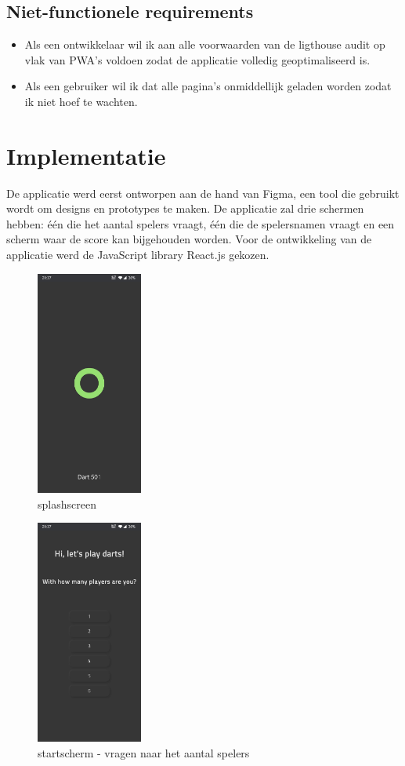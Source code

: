 	\subsection{Niet-functionele requirements}
		\begin{itemize}
			 \item Als een ontwikkelaar wil ik aan alle voorwaarden van de ligthouse audit op vlak van PWA's voldoen zodat de applicatie volledig geoptimaliseerd is.
			 \item Als een gebruiker wil ik dat alle pagina's onmiddellijk geladen worden zodat ik niet hoef te wachten.
		\end{itemize}	


\section{Implementatie}

	De applicatie werd eerst ontworpen aan de hand van Figma, een tool die gebruikt wordt om designs en prototypes te maken. De applicatie zal drie schermen hebben: één die het aantal spelers vraagt, één die de spelersnamen vraagt en een scherm waar de score kan bijgehouden worden. Voor de ontwikkeling van de applicatie werd de JavaScript library React.js gekozen.

	\begin{figure}[H]
		\centering
		\includegraphics[width=35mm]{./img/dart1.jpg}{}
		\caption{splashscreen}
	\end{figure}
	
	\begin{figure}[H]
		\centering
		\includegraphics[width=35mm]{./img/dart2.jpg}{}
		\caption{startscherm - vragen naar het aantal spelers}
	\end{figure}
	
